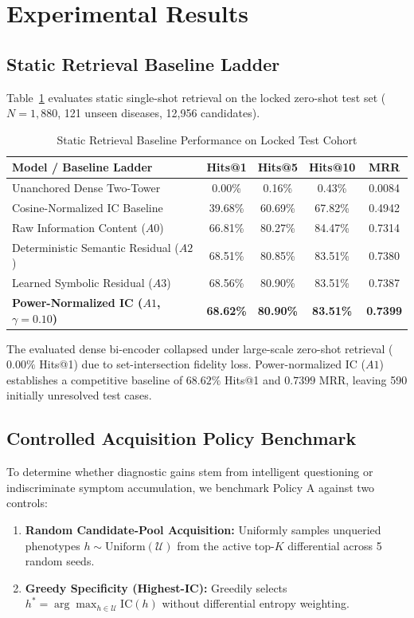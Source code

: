\documentclass[conference]{IEEEtran}
\begin{document}
\section{Experimental Results}

\subsection{Static Retrieval Baseline Ladder}
Table~\ref{tab:static_baselines} evaluates static single-shot retrieval on the locked zero-shot test set ($N=1,880$, 121 unseen diseases, 12,956 candidates).

\begin{table}[htbp]
\caption{Static Retrieval Baseline Performance on Locked Test Cohort}
\begin{center}
\begin{tabular}{lcccc}
\toprule
\textbf{Model / Baseline Ladder} & \textbf{Hits@1} & \textbf{Hits@5} & \textbf{Hits@10} & \textbf{MRR} \\
\midrule
Unanchored Dense Two-Tower & 0.00\% & 0.16\% & 0.43\% & 0.0084 \\
Cosine-Normalized IC Baseline & 39.68\% & 60.69\% & 67.82\% & 0.4942 \\
Raw Information Content ($A0$) & 66.81\% & 80.27\% & 84.47\% & 0.7314 \\
Deterministic Semantic Residual ($A2$) & 68.51\% & 80.85\% & 83.51\% & 0.7380 \\
Learned Symbolic Residual ($A3$) & 68.56\% & 80.90\% & 83.51\% & 0.7387 \\
\textbf{Power-Normalized IC ($A1$, $\gamma=0.10$)} & \textbf{68.62\%} & \textbf{80.90\%} & \textbf{83.51\%} & \textbf{0.7399} \\
\bottomrule
\end{tabular}
\label{tab:static_baselines}
\end{center}
\end{table}

The evaluated dense bi-encoder collapsed under large-scale zero-shot retrieval ($0.00\%$ Hits@1) due to set-intersection fidelity loss. Power-normalized IC ($A1$) establishes a competitive baseline of $68.62\%$ Hits@1 and $0.7399$ MRR, leaving 590 initially unresolved test cases.

\subsection{Controlled Acquisition Policy Benchmark}
To determine whether diagnostic gains stem from intelligent questioning or indiscriminate symptom accumulation, we benchmark Policy A against two controls:
\begin{enumerate}
    \item \textbf{Random Candidate-Pool Acquisition:} Uniformly samples unqueried phenotypes $h \sim \text{Uniform}(\mathcal{U})$ from the active top-$K$ differential across 5 random seeds.
    \item \textbf{Greedy Specificity (Highest-IC):} Greedily selects $h^* = \arg\max_{h \in \mathcal{U}} \text{IC}(h)$ without differential entropy weighting.
\end{enumerate}
\end{document}
